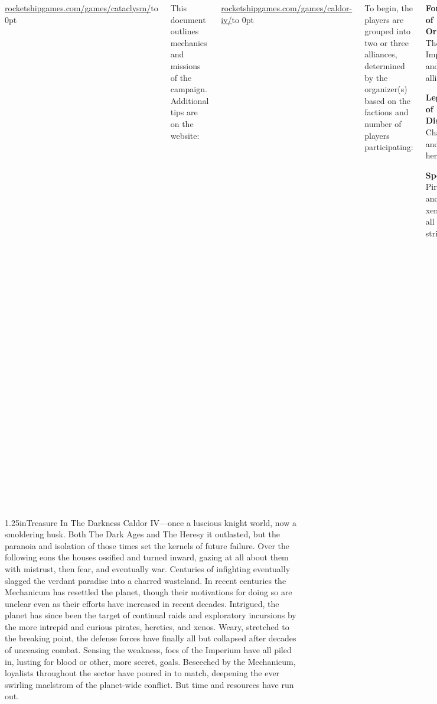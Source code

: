\begin{columns}
\begin{squishitemize}
\hfill\url{rocketshipgames.com/games/cataclysm/}\hfill\hbox to 0pt{}
\end{squishitemize}

This document outlines mechanics and missions of the campaign.
Additional tips are on the website:

\hfill\url{rocketshipgames.com/games/caldor-iv/}\hfill\hbox to 0pt{}


To begin, the players are grouped into two or three alliances,
determined by the organizer(s) based on the factions and number of
players participating:

\begin{squishitemize}
\item \textbf{Forces of Order:} The Imperium and its allies;
\item \textbf{Legions of Discord:} Chaos and heretics;
\item \textbf{Spoilers:} Pirates and xenos of all stripes.
\end{squishitemize}

If only two alliances are warranted by the campaign group, they should
play as Order and Discord.

At the outset of the campaign the Legions of Discord have descended on
Caldor IV en masse in search of \emph{The Scythe Of Unbound Light}, a
lost relic of many legends.  Under siege, the Forces of Order are
about to abandon Caldor IV entirely and scorch everything and everyone
left behind.  First, however, the Mechanicum's Magos Ferdinand,
ranking figure on the world, must be retrieved.  Unaware of the true
stakes, the Spoilers have come simply for bloodshed and whatever they
can plunder.

\end{columns}

\vfill
\begin{story}{1.25in}{Treasure In The Darkness}
  Caldor IV---once a luscious knight world, now a smoldering
  husk. Both The Dark Ages and The Heresy it outlasted, but the
  paranoia and isolation of those times set the kernels of future
  failure.  Over the following eons the houses ossified and turned
  inward, gazing at all about them with mistrust, then fear, and
  eventually war.  Centuries of infighting eventually slagged the
  verdant paradise into a charred wasteland.  In recent centuries the
  Mechanicum has resettled the planet, though their motivations for
  doing so are unclear even as their efforts have increased in recent
  decades.  Intrigued, the planet has since been the target of
  continual raids and exploratory incursions by the more intrepid and
  curious pirates, heretics, and xenos.  Weary, stretched to the
  breaking point, the defense forces have finally all but collapsed
  after decades of unceasing combat.  Sensing the weakness, foes of
  the Imperium have all piled in, lusting for blood or other, more
  secret, goals.  Beseeched by the Mechanicum, loyalists throughout
  the sector have poured in to match, deepening the ever swirling
  maelstrom of the planet-wide conflict.  But time and resources have
  run out.
\end{story}
